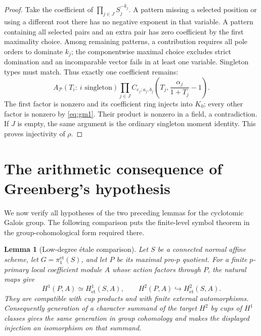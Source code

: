 \documentclass[11pt]{article}
\newtheorem{lemma}[theorem]{Lemma}
\theoremstyle{definition}
\numberwithin{equation}{section}
\begin{document}
\begin{proof}
Take the coefficient of $\prod_{j\in J}S_j^{-k_j}$.
A pattern missing a selected position or using a different root
there has no negative exponent in that variable. A pattern
containing all selected pairs and an extra pair has zero coefficient
by the first maximality choice. Among remaining patterns, a
contribution requires all pole orders to dominate $k_j$; the
componentwise maximal choice excludes strict domination and an
incomparable vector fails in at least one variable. Singleton types
must match. Thus exactly one coefficient remains:
\begin{equation}
 A_{\mathcal P}(T_i:\ i\text{ singleton})
 \prod_{j\in J}
 C_{e_j;a_j,b_j}\left(T_j,\frac{\alpha_j}{1+T_j}-1\right).
\end{equation}
The first factor is nonzero and its coefficient ring injects into
$K_0$; every other factor is nonzero by \eqref{eq:gm1}. Their product is
nonzero in a field, a contradiction. If $J$ is empty, the same
argument is the ordinary singleton moment identity. This proves
injectivity of $\rho$.
\end{proof}


\section{The arithmetic consequence of Greenberg's hypothesis}\label{sec:arith}

We now verify all hypotheses of the two preceding lemmas for the
cyclotomic Galois group. The following comparison puts the finite-level
symbol theorem in the group-cohomological form required there.
\begin{lemma}[Low-degree \'etale comparison]\label{lem:etale-prop}
Let $S$ be a connected normal affine scheme, let
$G=\pi_1^{\mathrm{\acute et}}(S)$, and let $P$ be its maximal
pro-$p$ quotient. For a finite $p$-primary local coefficient module
$A$ whose action factors through $P$, the natural maps give
\begin{equation}
 H^1(P,A)\simeq H^1_{\mathrm{\acute et}}(S,A),\qquad
 H^2(P,A)\hookrightarrow H^2_{\mathrm{\acute et}}(S,A).
\end{equation}
They are compatible with cup products and with finite external
automorphisms. Consequently generation of a character summand of
the target $H^2$ by cups of $H^1$ classes gives the same generation
in group cohomology and makes the displayed injection an
isomorphism on that summand.
\end{lemma}
\end{document}
